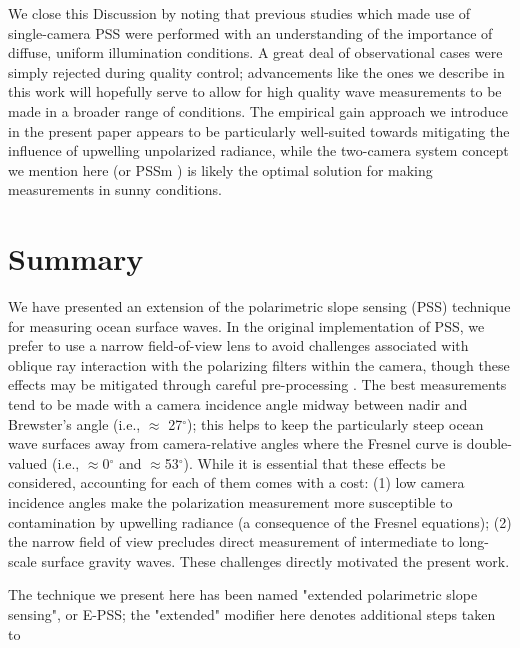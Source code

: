 \documentclass[letterpaper,journal]{IEEEtran}
\begin{document}
	We close this Discussion by noting that previous studies which made use of single-camera PSS \cite{Zappa2012,Laxague2015,Laxague2018b} were performed with an understanding of the importance of diffuse, uniform illumination conditions. A great deal of observational cases were simply rejected during quality control; advancements like the ones we describe in this work will hopefully serve to allow for high quality wave measurements to be made in a broader range of conditions. The empirical gain approach we introduce in the present paper appears to be particularly well-suited towards mitigating the influence of upwelling unpolarized radiance, while the two-camera system concept we mention here (or PSSm \cite{malinowski_surface_2024}) is likely the optimal solution for making measurements in sunny conditions.
	
	
	
	\section{Summary}
	\label{sec:summary}
	
	We have presented an extension of the polarimetric slope sensing (PSS) technique for measuring ocean surface waves. In the original implementation of PSS, we prefer to use a narrow field-of-view lens to avoid challenges associated with oblique ray interaction with the polarizing filters within the camera, though these effects may be mitigated through careful pre-processing \cite{pistellato_geometric_2024}. The best measurements tend to be made with a camera incidence angle midway between nadir and Brewster's angle (i.e., $\approx$ 27$^{\circ}$); this helps to keep the particularly steep ocean wave surfaces away from camera-relative angles where the Fresnel curve is double-valued (i.e., $\approx$0$^{\circ}$ and $\approx$53$^{\circ}$). While it is essential that these effects be considered, accounting for each of them comes with a cost: (1) low camera incidence angles make the polarization measurement more susceptible to contamination by upwelling radiance (a consequence of the Fresnel equations); (2) the narrow field of view precludes direct measurement of intermediate to long-scale surface gravity waves. These challenges directly motivated the present work.
	
	
	The technique we present here has been named "extended polarimetric slope sensing", or E-PSS; the "extended" modifier here denotes additional steps taken to 
	
\end{document}

